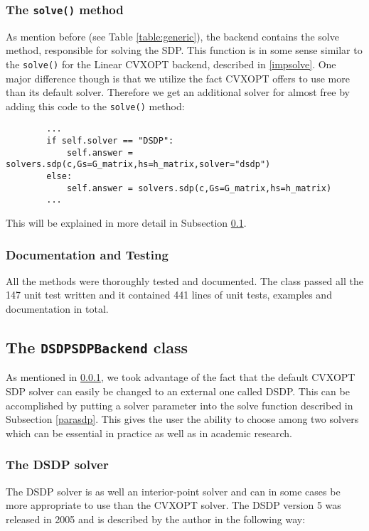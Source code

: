 	\subsubsection{The \texttt{solve()} method}
	\label{solvecvxoptsdp}
	As mention before (see Table \ref{table:generic}), the backend contains the solve method, responsible for solving the SDP. This function is in some sense similar to the \texttt{solve()} for the Linear CVXOPT backend, described in \ref{impsolve}. One major difference though is that we utilize the fact CVXOPT offers to use more than its default solver. Therefore we get an additional solver for almost free by adding this code to the  \texttt{solve()} method:
	\begin{verbatim}
        ...
        if self.solver == "DSDP":
            self.answer = solvers.sdp(c,Gs=G_matrix,hs=h_matrix,solver="dsdp")
        else:
            self.answer = solvers.sdp(c,Gs=G_matrix,hs=h_matrix)
        ...
    \end{verbatim}	 
 
This will be explained in more detail in Subsection \ref{dsdp}.

	\subsubsection{Documentation and Testing}
	All the methods were thoroughly tested and documented. The class passed all the 147 unit test written and it contained 441 lines of unit tests, examples and documentation in total. 

	
	

\subsection{The \texttt{DSDPSDPBackend} class}
\label{dsdp}
As mentioned in \ref{solvecvxoptsdp}, we took advantage of the fact that the default CVXOPT SDP solver can easily be changed to an external one called DSDP. This can be accomplished  by putting a solver parameter into the solve function described in Subsection \ref{parasdp}. This gives the user the ability to choose among two solvers which can be essential in practice as well as in academic research.

\subsubsection{The DSDP solver}
The DSDP solver is as well an interior-point solver and can in some cases be more appropriate to use than the CVXOPT solver. The DSDP version 5 was released in 2005 and is described by the author in the following way: 


